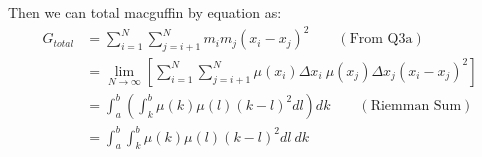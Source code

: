 \documentclass[12pt]{exam}
\begin{document}
\begin{enumerate}
\begin{enumerate}
	
	Then we can total macguffin by equation as:
	\begin{align*}
	    G_{total}&=\sum_{i=1}^{N}\sum_{j=i+1}^{N}m_im_j(x_i-x_j)^2\qquad(\mbox{From Q3a})\\
	    &=\lim_{N\to \infty }[\sum_{i=1}^{N}\sum_{j=i+1}^{N}\mu(x_i)\Delta x_i\ \mu(x_j)\Delta x_j(x_i-x_j)^2]\\
	    &=\int_a^b(\int_k^b\mu(k)\mu(l)(k-l)^2dl)dk\qquad(\mbox{Riemman Sum})\\
	    &=\int_a^b\int_k^b\mu(k)\mu(l)(k-l)^2dl\ dk
	\end{align*}
	
\end{enumerate}



\end{enumerate}
\end{document}

